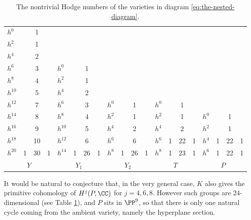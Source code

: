 \begin{table}[htb]
\centering
\smaller\smaller
\begin{tabular}{||l | c c c  ||l | c c c  ||l | c c c  ||l | c c c  || l | c c c  ||}
\hline
$h^0$ & & 1 & &  & & & &  & & & &  & & & &  & & & \\
$h^2$ & & 1 & &  & & & &  & & & &  & & & &  & & &  \\
$h^4$ & & 2 & &  & & & &  & & & &  & & & &  & & &  \\
$h^6$ & & 3 & &  $h^0$ & & 1 & &  & & & &  & & & &  & & &  \\
$h^8$ & & 4 & &  $h^2$ & & 1 & &  & & & &  & & & &  & & & \\
$h^{10}$ & & 5 & &  $h^4$ & & 2 & &  & & & &  & & & &  & & & \\
$h^{12}$ & & 7 & &  $h^6$ & & 3 & &  $h^0$ & & 1 & &  $h^0$ & & 1 & &  & & & \\
$h^{14}$ & & 8 & &  $h^8$ & & 4 & &  $h^2$& & 1 & &  $h^2$& & 1 & &  $h^0$ & & 1 & \\
$h^{16}$ & & 9 & & $h^{10}$ & & 5 & &  $h^4$ & & 2 & &  $h^4$ & & 2 & &  $h^2$ & & 1 & \\
$h^{18}$ & & 10 & & $h^{12}$ & & 6 & & $h^6$ & & 6 & &  $h^6$ & 1 & 22 & 1& $h^4$ & 1 & 22 & 1 \\
$h^{20}$ & 1 & 30 & 1 &  $h^{14}$ & 1 & 26 & 1 &  $h^8$ & 1 & 26 & 1 &  $h^8$ & 1 & 23 & 1 & $h^6$ & 1 & 22 & 1 \\
\hline
\multicolumn{4}{||c||}{\multirow{2}{*}{$Y$}} & \multicolumn{4}{c||}{\multirow{2}{*}{$Y_1$}} & \multicolumn{4}{c||}{\multirow{2}{*}{$Y_2$}}& \multicolumn{4}{c||}{\multirow{2}{*}{$T$}} & \multicolumn{4}{c||}{\multirow{2}{*}{$P$}}\\
\multicolumn{4}{||c||}{} & \multicolumn{4}{c||}{} & \multicolumn{4}{c||}{} & \multicolumn{4}{c||}{} & \multicolumn{4}{c||}{} \\ \hline
\end{tabular}
\vspace*{5pt}
\caption{The nontrivial Hodge numbers of the varieties in diagram \eqref{eq:the-nested-diagram}.}\label{tab}
\vspace*{-1.5\baselineskip}
\end{table}

It would be natural to conjecture that, in the very general case, $K$ also gives the primitive
cohomology of $H^j(P,\CC)$ for $j=4,6,8$. However such groups are $24$\nobreakdash-dimen\-sional (see Table \ref{tab}),
and $P$ sits in $\PP^9$, so that there is only one natural cycle coming from the ambient variety,
namely the hyperplane section.

